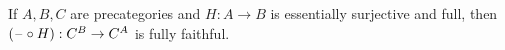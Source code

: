 \documentclass[hott-all.tex]{subfiles}
\begin{document}
\begin{lem}\label{ct:esofull-precomp-ff}
  If $A,B,C$ are precategories and $H:A\to B$ is essentially surjective and full, then $(\mathord{\hspace{1pt}\text{--}\hspace{1pt}}\circ H):C^B \to C^A$ is fully faithful.
\end{lem}
%
\end{document}
